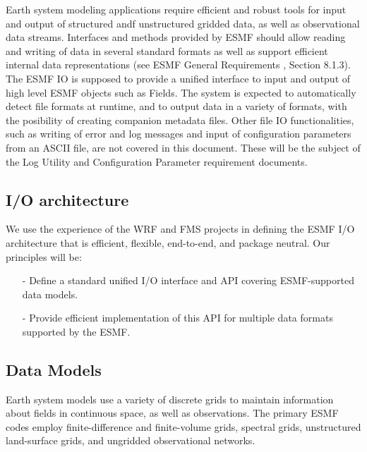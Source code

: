 

Earth system modeling applications require efficient and robust tools
for input and output of structured andf unstructured gridded data, as
well as observational data streams.  Interfaces and methods provided
by ESMF should allow reading and writing of data in several standard
formats as well as support efficient internal data representations
(see ESMF General Requirements
\cite{ESMFGenReq}, Section 8.1.3). The ESMF IO is supposed to provide
a unified interface to input and output of high level ESMF objects
such as Fields.  The system is expected to automatically detect file
formats at runtime, and to output data in a variety of formats, with
the posibility of creating companion metadata files. Other file IO
functionalities, such as writing of error and log messages and input of
configuration parameters from an ASCII file, are not covered in this
document. These will be the subject of the Log Utility and
Configuration Parameter requirement documents.


\subsection{I/O architecture}

We use the experience of the WRF \cite{WRF-Software} and FMS 
\cite{Balaji_Parallel_IO_2000}  projects in defining the 
ESMF I/O architecture that is efficient, flexible, end-to-end, and package 
neutral. Our principles will be:

\begin{itemize}
\item[-] Define a standard unified I/O interface and API covering 
         ESMF-supported data models.
\item[-] Provide efficient implementation of this API for multiple data 
         formats supported by the ESMF. 
\end{itemize}



\subsection{Data Models}

Earth system models use a variety of discrete grids to maintain information 
about fields in continuous space, as well as observations. The primary ESMF 
codes employ finite-difference and finite-volume grids, spectral grids, 
unstructured land-surface grids, and ungridded observational networks.

